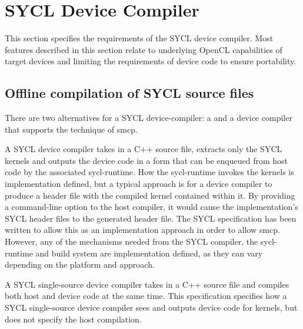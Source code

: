 %


\chapter{SYCL Device Compiler}
\label{chapter.device.compiler}

This section specifies the requirements of the SYCL device compiler.
Most features described in this section relate to underlying OpenCL
capabilities of target devices and limiting the requirements of device
code to ensure portability.

\section{Offline compilation of SYCL source files}

There are two alternatives for a SYCL \gls{device-compiler}: a 
 and a device compiler that supports
the technique of \gls{smcp}.

A SYCL device compiler takes in a C++ source file, extracts only
the SYCL kernels and outputs the device code in a form that can be enqueued
from host code by the associated \gls{sycl-runtime}. How the \gls{sycl-runtime} invokes the
kernels is implementation defined, but a typical approach is for a device
compiler to produce a header file with the compiled kernel contained within it.
By providing a command-line option to the host compiler, it would cause the
implementation's SYCL header files to  the generated header file.
The SYCL specification has been written to allow this as an implementation
approach in order to allow \gls{smcp}. However, any of the
mechanisms needed from the SYCL compiler, the \gls{sycl-runtime} and build system are
implementation defined, as they can vary depending on the platform and approach.

A SYCL single-source device compiler takes in a C++ source file and compiles
both host and device code at the same time. This specification specifies how
a SYCL single-source device compiler sees and outputs device code for kernels,
but does not specify the host compilation.

